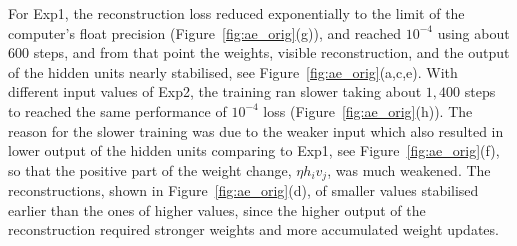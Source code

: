 For Exp1, the reconstruction loss reduced exponentially to the limit of the computer's float precision (Figure~\ref{fig:ae_orig}(g)), and reached $10^{-4}$ using about 600 steps, and from that point the weights, visible reconstruction, and the output of the hidden units nearly stabilised, see Figure~\ref{fig:ae_orig}(a,c,e).
With different input values of Exp2, the training ran slower taking about $1,400$ steps to reached the same performance of $10^{-4}$ loss (Figure~\ref{fig:ae_orig}(h)).
The reason for the slower training was due to the weaker input which also resulted in lower output of the hidden units comparing to Exp1, see Figure~\ref{fig:ae_orig}(f), so that the positive part of the weight change, $\eta h_i v_j$, was much weakened. 
The reconstructions, shown in Figure~\ref{fig:ae_orig}(d), of smaller values stabilised earlier than the ones of higher values, since the higher output of the reconstruction required stronger weights and more accumulated weight updates. 
